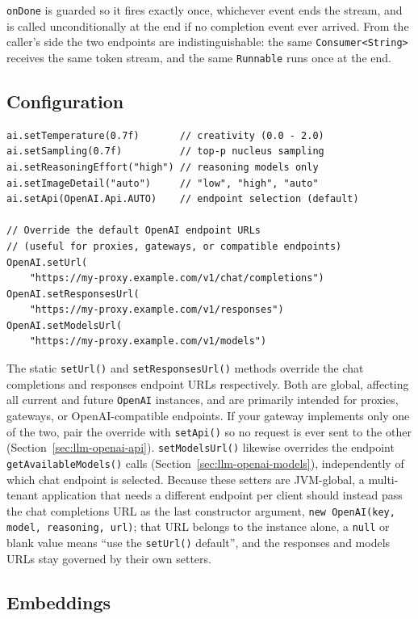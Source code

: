 \noindent
\texttt{onDone} is guarded so it fires exactly once, whichever event ends the stream, and is called unconditionally at the end if no completion event ever arrived.  From the caller's side the two endpoints are indistinguishable: the same \texttt{Consumer<String>} receives the same token stream, and the same \texttt{Runnable} runs once at the end.

\subsection{Configuration}

\begin{lstlisting}[style=groovy]
ai.setTemperature(0.7f)       // creativity (0.0 - 2.0)
ai.setSampling(0.7f)          // top-p nucleus sampling
ai.setReasoningEffort("high") // reasoning models only
ai.setImageDetail("auto")     // "low", "high", "auto"
ai.setApi(OpenAI.Api.AUTO)    // endpoint selection (default)

// Override the default OpenAI endpoint URLs
// (useful for proxies, gateways, or compatible endpoints)
OpenAI.setUrl(
    "https://my-proxy.example.com/v1/chat/completions")
OpenAI.setResponsesUrl(
    "https://my-proxy.example.com/v1/responses")
OpenAI.setModelsUrl(
    "https://my-proxy.example.com/v1/models")
\end{lstlisting}

\noindent
The static \texttt{setUrl()} and \texttt{setResponsesUrl()} methods override the chat completions and responses endpoint URLs respectively.  Both are global, affecting all current and future \texttt{OpenAI} instances, and are primarily intended for proxies, gateways, or OpenAI-compatible endpoints.  If your gateway implements only one of the two, pair the override with \texttt{setApi()} so no request is ever sent to the other (Section~\ref{sec:llm-openai-api}).  \texttt{setModelsUrl()} likewise overrides the endpoint \texttt{getAvailableModels()} calls (Section~\ref{sec:llm-openai-models}), independently of which chat endpoint is selected.  Because these setters are JVM-global, a multi-tenant application that needs a different endpoint per client should instead pass the chat completions URL as the last constructor argument, \texttt{new OpenAI(key, model, reasoning, url)}; that URL belongs to the instance alone, a \texttt{null} or blank value means ``use the \texttt{setUrl()} default'', and the responses and models URLs stay governed by their own setters.

\subsection{Embeddings}

